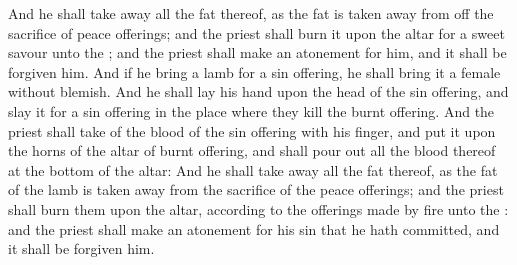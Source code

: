 \begin{biblechapter}
\verse And he shall take away all the fat thereof, as the fat is taken away from off the sacrifice of peace offerings; and the priest shall burn it upon the altar for a sweet savour unto the \LORD; and the priest shall make an atonement for him, and it shall be forgiven him.
\verse And if he bring a lamb for a sin offering, he shall bring it a female without blemish.
\verse And he shall lay his hand upon the head of the sin offering, and slay it for a sin offering in the place where they kill the burnt offering.
\verse And the priest shall take of the blood of the sin offering with his finger, and put it upon the horns of the altar of burnt offering, and shall pour out all the blood thereof at the bottom of the altar:
\verse And he shall take away all the fat thereof, as the fat of the lamb is taken away from the sacrifice of the peace offerings; and the priest shall burn them upon the altar, according to the offerings made by fire unto the \LORD: and the priest shall make an atonement for his sin that he hath committed, and it shall be forgiven him.
\end{biblechapter}

\flushcolsend\columnbreak %

